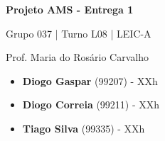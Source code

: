 \documentclass[12pt,a4paper]{article}
\begin{document}
\begin{titlepage}
  \begin{center}
    \vspace*{5cm}

    \Huge
    \textbf{Projeto AMS - Entrega 1}

    \vspace{0.5cm}
    \LARGE
    Grupo 037 | Turno L08 | LEIC-A

    \vspace{0.5cm}
    \large
    Prof. Maria do Rosário Carvalho

    \vfill
  \end{center}
  \large
  \begin{itemize}
    \item[] \textbf{Diogo Gaspar} (99207) - XXh
    \item[] \textbf{Diogo Correia} (99211) - XXh
    \item[] \textbf{Tiago Silva} (99335) - XXh
  \end{itemize}
\end{titlepage}

\begin{landscape}
  \begin{center}
    
  \end{center}
\end{landscape}

\begin{landscape}
  \begin{center}
    
  \end{center}
\end{landscape}
\end{document}
